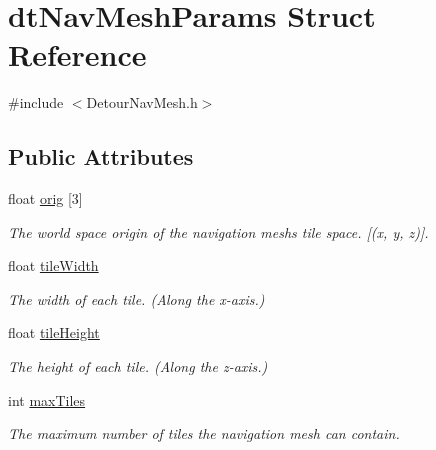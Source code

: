 \hypertarget{structdtNavMeshParams}{}\section{dt\+Nav\+Mesh\+Params Struct Reference}
\label{structdtNavMeshParams}


{\ttfamily \#include $<$Detour\+Nav\+Mesh.\+h$>$}

\subsection*{Public Attributes}
\begin{DoxyCompactItemize}
\item 
\mbox{\label{structdtNavMeshParams_a213b6629021c50f9d6f776a16d1e725b}} 
float \hyperlink{structdtNavMeshParams_a213b6629021c50f9d6f776a16d1e725b}{orig} \mbox{[}3\mbox{]}
\begin{DoxyCompactList}\small\item\em The world space origin of the navigation mesh\textquotesingle{}s tile space. \mbox{[}(x, y, z)\mbox{]}. \end{DoxyCompactList}\item 
\mbox{\label{structdtNavMeshParams_a53836f7c15d5e483209e01e9e1386e7e}} 
float \hyperlink{structdtNavMeshParams_a53836f7c15d5e483209e01e9e1386e7e}{tile\+Width}
\begin{DoxyCompactList}\small\item\em The width of each tile. (Along the x-\/axis.) \end{DoxyCompactList}\item 
\mbox{\label{structdtNavMeshParams_acca8c83bab38cd8c7da8f10103e2c45a}} 
float \hyperlink{structdtNavMeshParams_acca8c83bab38cd8c7da8f10103e2c45a}{tile\+Height}
\begin{DoxyCompactList}\small\item\em The height of each tile. (Along the z-\/axis.) \end{DoxyCompactList}\item 
\mbox{\label{structdtNavMeshParams_ad6027d623e81058f0d9b2a2adf803f00}} 
int \hyperlink{structdtNavMeshParams_ad6027d623e81058f0d9b2a2adf803f00}{max\+Tiles}
\begin{DoxyCompactList}\small\item\em The maximum number of tiles the navigation mesh can contain. \end{DoxyCompactList}\item 

\end{DoxyCompactItemize}
